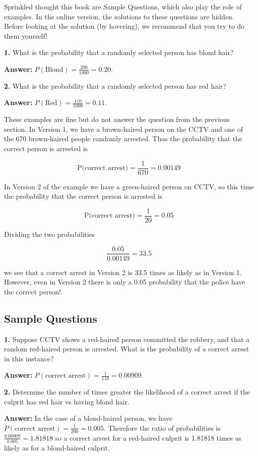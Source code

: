 \documentclass[
]{book}
\begin{document}
Sprinkled thought this book are Sample Questions, which also play the role
of examples. In the online version, the
solutions to these questions are hidden. Before looking at the solution
(by hovering), we recommend that you try to do them yourself!

\textbf{1.} What is the probability that a randomly selected person has blond hair?

\textbf{Answer:} \(P(\text{Blond}) = \frac{200}{1000} = 0.20\).

\textbf{2.} What is the probability that a randomly selected person has red hair?

\textbf{Answer:} \(P(\text{Red}) = \frac{110}{1000} = 0.11\).

These examples are fine but do not answer the question from the previous section.
In Version 1, we have a brown-haired person on the CCTV and one of the
670 brown-haired people randomly arrested.
Thus the probability that the correct person is arrested is

\[\mbox{P(correct arrest)} = \frac{1}{670} = 0.00149\]

In Version 2 of the example we have a green-haired person on CCTV, so this
time the probability that the correct person is arrested is

\[\mbox{P(correct arrest)} = \frac{1}{20} = 0.05\]

Dividing the two probabilities

\[\frac{0.05}{0.00149} = 33.5\]

we see that a correct arrest in Version 2 is 33.5 times as likely as in Version 1.
However, even in Version 2 there is only a 0.05 probability that the police have
the correct person!

\hypertarget{sample-questions-1}{%
\subsection{Sample Questions}\label{sample-questions-1}}

\textbf{1.} Suppose CCTV shows a red-haired person committed the robbery, and that
a random red-haired person is arrested. What is the probability of a correct
arrest in this instance?

\textbf{Answer:} \(P(\text{correct arrest}) = \frac{1}{110} = 0.00909\).

\textbf{2.} Determine the number of times greater the likelihood of a correct arrest
if the culprit has red hair vs having blond hair.

\textbf{Answer:} In the case of a blond-haired person, we have
\(P(\text{correct arrest}) = \frac{1}{200} = 0.005\). Therefore the ratio
of probabilities is
\(\frac{0.00909}{0.005} = 1.81818\)
so a correct arrest for a red-haired culprit is 1.81818 times as likely
as for a blond-haired culprit.
\end{document}
